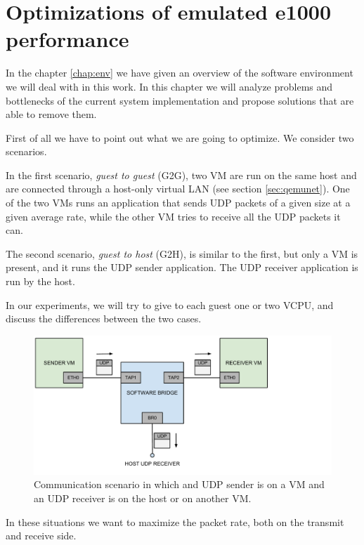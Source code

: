 \chapter{Optimizations of emulated e1000 performance}
\label{cha:e1000-opt}
In the chapter \ref{chap:env} we have given an overview of the software environment we will deal with in this work.
In this chapter we will analyze problems and bottlenecks of the current system implementation and propose solutions that are able
to remove them.

\vspace{0.5cm}

First of all we have to point out what we are going to optimize. We consider two scenarios.

In the first scenario, \emph{guest to guest} (G2G), two VM are run on the same host and are connected through a host-only virtual LAN (see 
section \ref{sec:qemunet}). One of the two VMs runs an application that sends UDP packets of a given size at a given average rate, while 
the other VM tries to receive all the UDP packets it can.

The second scenario, \emph{guest to host} (G2H), is similar to the first, but only a VM is present, and it runs the UDP sender application. The UDP receiver application
is run by the host.

In our experiments, we will try to give to each guest one or two VCPU, and discuss the differences between the two cases.

\begin{figure}[bt]
\centering
\includegraphics[scale = 0.60]{scenario.pdf}
\caption{Communication scenario in which and UDP sender is on a VM and an UDP receiver is on the host or on another VM.}
\label{fig:scenario}
\end{figure}

\vspace{0.5cm}

In these situations we want to maximize the packet rate, both on the transmit and receive side.


